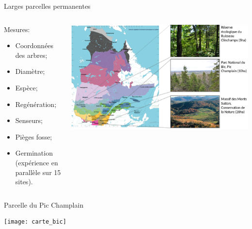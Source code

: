 \documentclass{eecslides}
\begin{document}
	\begin{frame}{Larges parcelles permanentes}
		\begin{columns}
			\begin{column}{0.35\textwidth}
			Mesures:
				\begin{itemize}
					\item Coordonnées des arbres;
					\item Diamètre;
					\item Espèce;			
					\item Regénération;
					\item Senseurs;
					\item Pièges fosse;
					\item Germination (expérience en parallèle sur 15 sites).
				\end{itemize}
			\end{column}	
			\begin{column}{0.65\textwidth}
				\begin{center}
					\includegraphics[height=0.5\textheight]{carte_parcelles}
				\end{center}
			\end{column}
		\end{columns}	    	
	\end{frame}


	\begin{frame}{Parcelle du Pic Champlain}
				\begin{center}
					\texttt{[image: carte\_bic]}
				\end{center}
	\end{frame}

\end{document}
